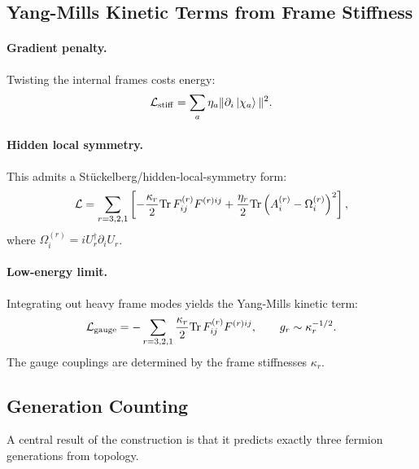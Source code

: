\subsection{Yang-Mills Kinetic Terms from Frame Stiffness}\label{sec:quantum-ym}

\paragraph{Gradient penalty.}
Twisting the internal frames costs energy:
\begin{equation}
\mathcal{L}_{\rm stiff} = \sum_a \eta_a \|\partial_i\ket{\chi_a}\|^2.
\end{equation}

\paragraph{Hidden local symmetry.}
This admits a St\"uckelberg/hidden-local-symmetry form:
\begin{equation}
\mathcal{L} = \sum_{r=3,2,1}\left[-\frac{\kappa_r}{2}{\rm Tr}\,F_{ij}^{(r)} F^{(r)ij} + \frac{\eta_r}{2}{\rm Tr}\left(A_i^{(r)} - \Omega_i^{(r)}\right)^2\right],
\end{equation}
where $\Omega_i^{(r)} = i U_r^\dagger \partial_i U_r$.

\paragraph{Low-energy limit.}
Integrating out heavy frame modes yields the Yang-Mills kinetic term:
\begin{equation}
\mathcal{L}_{\rm gauge} = -\sum_{r=3,2,1}\frac{\kappa_r}{2}{\rm Tr}\,F_{ij}^{(r)} F^{(r)ij}, \qquad g_r \sim \kappa_r^{-1/2}.
\end{equation}
The gauge couplings are determined by the frame stiffnesses $\kappa_r$.

\subsection{Generation Counting}\label{sec:quantum-generations}

A central result of the construction is that it predicts exactly three fermion generations from topology.

